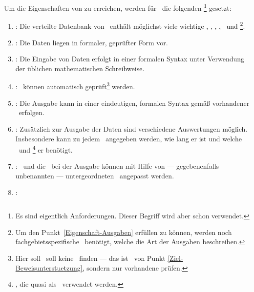 \section[Ziele]{\Ziele}%
\beginsection  {\Ziele}
\label      {sec-Ziele}

Um die Eigenschaften von  zu erreichen, werden für \ASBA\ die folgenden \Ziele%
\footnote{%
	Es sind eigentlich Anforderungen.
	Dieser Begriff wird aber schon  verwendet.
}
gesetzt:
\begin{enumerate}
	\item \label{Ziel-Daten} :
	Die verteilte Datenbank von \ASBA\ enthält möglichst viele wichtige \Axiome, \Saetze, \Beweise, \Fachbegriffe, \Teilgebiete\ und \Ausgabeschemata%
	\footnote{%
		Um den Punkt~\ref{Eigenschaft-Ausgaben}  erfüllen zu können, werden noch fachgebietsspezifische \Ausgabeschemata\ benötigt, welche die Art der Ausgaben beschreiben.
	}.
	\item \label{Ziel-Form} :
	Die Daten liegen in formaler, geprüfter Form vor.
	\item \label{Ziel-Eingaben} :
	Die Eingabe von Daten erfolgt in einer formalen Syntax unter Verwendung der üblichen mathematischen Schreibweise.
	\item \label{Ziel-Pruefung} :
	\Beweise\ können automatisch geprüft\footnote{%
		Hier soll \ASBA\ soll keine \Beweise\ finden --- das ist \Ziel\ von Punkt \ref{Ziel-Beweisunterstuetzung}, sondern nur vorhandene prüfen.
	}
	werden.
	\item \label{Ziel-Ausgaben} :
	Die Ausgabe kann in einer eindeutigen, formalen Syntax gemäß vorhandener \Ausgabeschemata\ erfolgen.
	\item \label{Ziel-Auswertungen} :
	Zusätzlich zur Ausgabe der Daten sind verschiedene Auswertungen möglich.
	Insbesondere kann zu jedem \Beweis\ angegeben werden, wie lang er ist und welche \Axiome\ und \Saetze%
	\footnote{%
		\Saetze, die quasi als \Axiome\ verwendet werden.
	}
	er benötigt.
	\item \label{Ziel-Anpassbarkeit} :
	\Fachbegriffe\ und die \Darstellung\ bei der Ausgabe können mit Hilfe von --- gegebenenfalls unbenannten --- untergeordneten \Teilgebieten\ angepasst werden.
	\item \label{Ziel-Individualitaet} :

\end{enumerate}
